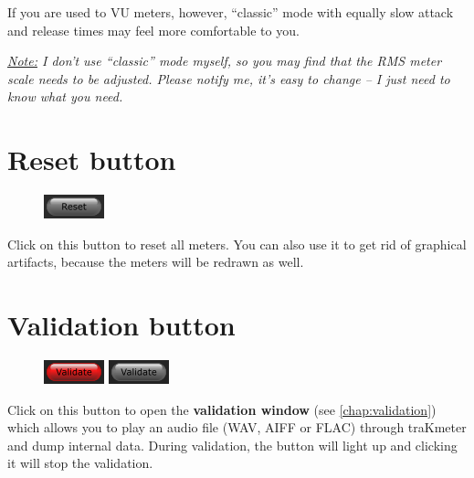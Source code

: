 If you are used to VU meters, however, ``classic'' mode with equally
slow attack and release times may feel more comfortable to you.

\emph{\underline{Note:} I don't use ``classic'' mode myself, so you
  may find that the RMS meter scale needs to be adjusted.  Please
  notify me, it's easy to change -- I just need to know what you
  need.}

\newpage %

\section{Reset button}

\begin{figure}
  \includegraphics[scale=\screenshotscale,clip]{include/images/button_reset.png}
\end{figure}

Click on this button to reset all meters.  You can also use it to get
rid of graphical artifacts, because the meters will be redrawn as
well.

\section{Validation button}
\label{sec:validation_button}

\begin{figure}
  \includegraphics[scale=\screenshotscale,clip]{include/images/button_validate_on.png}
  \newline \vspace{-0.9\baselineskip}
  \includegraphics[scale=\screenshotscale,clip]{include/images/button_validate_off.png}
\end{figure}

Click on this button to open the \textbf{validation window} (see
\ref{chap:validation}) which allows you to play an audio file (WAV,
AIFF or FLAC) through traKmeter and dump internal data.  During
validation, the button will light up and clicking it will stop the
validation.

